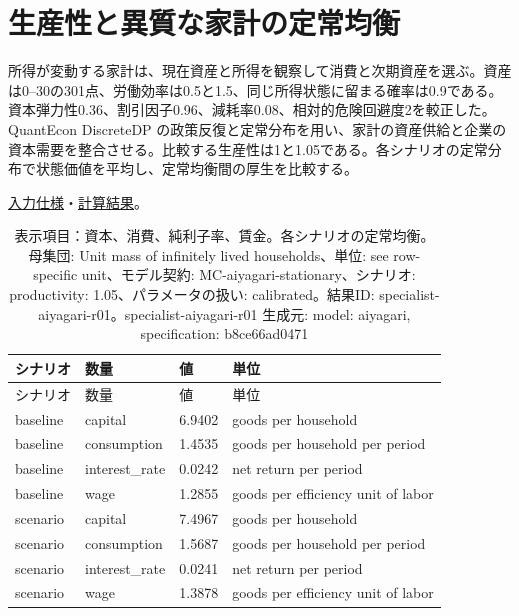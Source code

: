 \documentclass[ecta,nameyear,draft]{econsocart}
\begin{document}
\begin{minipage}{\linewidth}

\section{生産性と異質な家計の定常均衡}\label{result-15}

所得が変動する家計は、現在資産と所得を観察して消費と次期資産を選ぶ。資産は0--30の301点、労働効率は0.5と1.5、同じ所得状態に留まる確率は0.9である。資本弾力性0.36、割引因子0.96、減耗率0.08、相対的危険回避度2を較正した。QuantEcon
DiscreteDP
の政策反復と定常分布を用い、家計の資産供給と企業の資本需要を整合させる。比較する生産性は1と1.05である。各シナリオの定常分布で状態価値を平均し、定常均衡間の厚生を比較する。

\href{https://github.com/yoshimurahiroki/econ-project-mini/blob/f9093ba87cabce7bee1fdf3391656544617a8cb9/examples/research-workspace/models/aiyagari-spec.json}{入力仕様}・\href{https://github.com/yoshimurahiroki/econ-project-mini/blob/f9093ba87cabce7bee1fdf3391656544617a8cb9/examples/research-workspace/models/aiyagari-result.json}{計算結果}。

\begin{longtable}[]{@{}llll@{}}
\caption{表示項目：資本、消費、純利子率、賃金。各シナリオの定常均衡。母集団:
Unit mass of infinitely lived households、単位: see row-specific
unit、モデル契約: MC-aiyagari-stationary、シナリオ: productivity:
1.05、パラメータの扱い: calibrated。結果ID:
specialist-aiyagari-r01。specialist-aiyagari-r01 生成元: model:
aiyagari, specification: b8ce66ad0471}\tabularnewline
\toprule\noalign{}
シナリオ & 数量 & 値 & 単位 \\
\midrule\noalign{}
\endfirsthead
\toprule\noalign{}
シナリオ & 数量 & 値 & 単位 \\
\midrule\noalign{}
\endhead
\bottomrule\noalign{}
\endlastfoot
baseline & capital & 6.9402 & goods per household \\
baseline & consumption & 1.4535 & goods per household per period \\
baseline & interest\_rate & 0.0242 & net return per period \\
baseline & wage & 1.2855 & goods per efficiency unit of labor \\
scenario & capital & 7.4967 & goods per household \\
scenario & consumption & 1.5687 & goods per household per period \\
scenario & interest\_rate & 0.0241 & net return per period \\
scenario & wage & 1.3878 & goods per efficiency unit of labor \\
\end{longtable}

\end{minipage}
\end{document}
